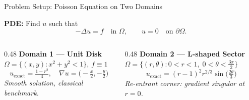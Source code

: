 \documentclass[10pt,aspectratio=169]{beamer}
\begin{document}
\begin{frame}{Problem Setup: Poisson Equation on Two Domains}

  \textbf{PDE:} Find $u$ such that
  \[
    -\Delta u = f \quad \text{in } \Omega, \qquad u = 0 \quad \text{on } \partial\Omega.
  \]

  \begin{columns}[T]
    \begin{column}{0.48\textwidth}
      \textbf{Domain 1 — Unit Disk}\\[4pt]
      $\Omega = \{(x,y) : x^2 + y^2 < 1\}$, $f \equiv 1$
      \[
        u_{\text{exact}} = \tfrac{1-r^2}{4},\quad
        \nabla u = \bigl(-\tfrac{x}{2}, -\tfrac{y}{2}\bigr)
      \]
      \textit{Smooth solution, classical benchmark.}

      \begin{center}
      \end{center}
    \end{column}
    \begin{column}{0.48\textwidth}
      \textbf{Domain 2 — L-shaped Sector}\\[4pt]
      $\Omega = \{(r,\theta) : 0<r<1,\; 0<\theta<\tfrac{3\pi}{2}\}$
      \[
        u_{\text{exact}} = (r-1)^2 r^{2/3}\sin\!\bigl(\tfrac{2\theta}{3}\bigr)
      \]
      \textit{Re-entrant corner: gradient singular at $r=0$.}

      \begin{center}
      \end{center}
    \end{column}
  \end{columns}
\end{frame}
\end{document}

